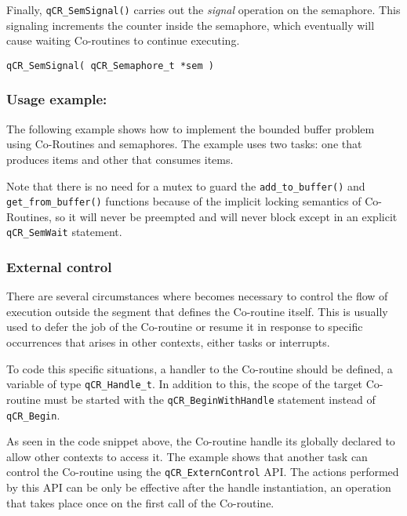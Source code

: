 Finally, \lstinline{qCR_SemSignal()}  carries out the \textit{signal} operation on the semaphore. This signaling increments the counter inside the semaphore, which eventually will cause waiting Co-routines to continue executing.
\medskip

\begin{lstlisting}[style=CStyle]
qCR_SemSignal( qCR_Semaphore_t *sem )
\end{lstlisting}


\subsubsection*{Usage example:}
The following example shows how to implement the bounded buffer problem using Co-Routines and semaphores. The example uses two tasks: one that produces items and other that consumes items.

Note that there is no need for a mutex to guard the \lstinline{add_to_buffer()} and \lstinline{get_from_buffer()} functions because of the implicit locking semantics of Co-Routines, so it will never be preempted and will never block except in an explicit \lstinline{qCR_SemWait} statement.
\medskip



\subsubsection{External control}
There are several circumstances where becomes necessary to control the flow of execution outside the segment that defines the Co-routine itself. This is usually used to defer the job of the Co-routine or resume it in response to specific occurrences that arises in other contexts, either tasks or interrupts.

To code this specific situations, a handler to the Co-routine should be defined, a variable of type \lstinline{qCR_Handle_t}. In addition to this, the scope of the target Co-routine must be started with the \lstinline{qCR_BeginWithHandle} statement instead of \lstinline{qCR_Begin}.
\medskip



As seen in the code snippet above, the Co-routine handle its globally declared to allow other contexts to access it.  The example shows that another task can control the Co-routine using the \lstinline{qCR_ExternControl} API. The actions performed by this API can be only be effective after the handle instantiation, an operation that takes place once on the first call of the Co-routine.
\medskip

